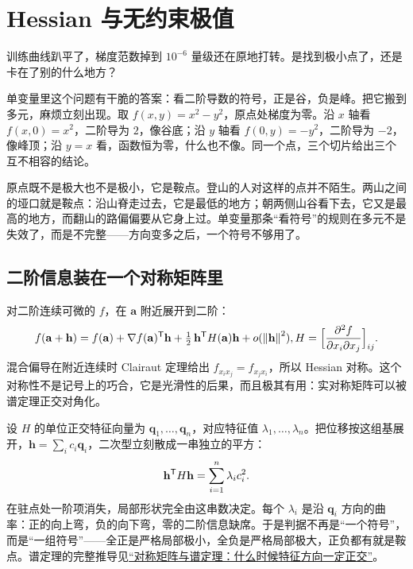 \section{Hessian 与无约束极值}
\label{sec:02-Calculus/06-Multivariable-Calculus/05}

训练曲线趴平了，梯度范数掉到 \(10^{-6}\) 量级还在原地打转。是找到极小点了，还是卡在了别的什么地方？

单变量里这个问题有干脆的答案：看二阶导数的符号，正是谷，负是峰。把它搬到多元，麻烦立刻出现。取 \(f(x,y)=x^2-y^2\)，原点处梯度为零。沿 \(x\) 轴看 \(f(x,0)=x^2\)，二阶导为 \(2\)，像谷底；沿 \(y\) 轴看 \(f(0,y)=-y^2\)，二阶导为 \(-2\)，像峰顶；沿 \(y=x\) 看，函数恒为零，什么也不像。同一个点，三个切片给出三个互不相容的结论。

原点既不是极大也不是极小，它是鞍点。登山的人对这样的点并不陌生。两山之间的垭口就是鞍点：沿山脊走过去，它是最低的地方；朝两侧山谷看下去，它又是最高的地方，而翻山的路偏偏要从它身上过。单变量那条``看符号''的规则在多元不是失效了，而是不完整——方向变多之后，一个符号不够用了。

\subsection{二阶信息装在一个对称矩阵里}

对二阶连续可微的 \(f\)，在 \(\mathbf a\) 附近展开到二阶：
\[
f(\mathbf a+\mathbf h)
=f(\mathbf a)+\nabla f(\mathbf a)^{\mathsf{T}}\mathbf h
+\tfrac12\,\mathbf h^{\mathsf{T}}H(\mathbf a)\mathbf h+o(\left\lVert\mathbf h\right\rVert^2),
\space
H=\Bigl[\frac{\partial^2 f}{\partial x_i\partial x_j}\Bigr]_{ij}.
\]
混合偏导在附近连续时 Clairaut 定理给出 \(f_{x_ix_j}=f_{x_jx_i}\)，所以 Hessian 对称。这个对称性不是记号上的巧合，它是光滑性的后果，而且极其有用：实对称矩阵可以被谱定理正交对角化。

设 \(H\) 的单位正交特征向量为 \(\mathbf q_1,\dots,\mathbf q_n\)，对应特征值 \(\lambda_1,\dots,\lambda_n\)。把位移按这组基展开，\(\mathbf h=\sum_i c_i\mathbf q_i\)，二次型立刻散成一串独立的平方：
\[
\mathbf h^{\mathsf{T}}H\mathbf h=\sum_{i=1}^n\lambda_i c_i^2 .
\]
在驻点处一阶项消失，局部形状完全由这串数决定。每个 \(\lambda_i\) 是沿 \(\mathbf q_i\) 方向的曲率：正的向上弯，负的向下弯，零的二阶信息缺席。于是判据不再是``一个符号''，而是``一组符号''——全正是严格局部极小，全负是严格局部极大，正负都有就是鞍点。谱定理的完整推导见\hyperref[sec:03-Linear-Algebra/06-Symmetric-and-Positive-Definite-Matrices/01]{``对称矩阵与谱定理：什么时候特征方向一定正交''}。

